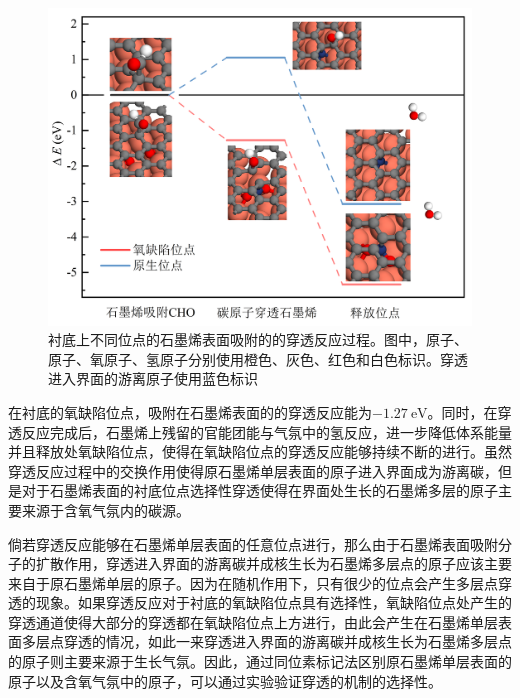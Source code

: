 \begin{figure}[htb]
    \includegraphics{pic/FLG_DFT_CHOpene.png}
    \caption{衬底上不同位点的石墨烯表面吸附的的穿透反应过程。图中，原子、原子、氧原子、氢原子分别使用橙色、灰色、红色和白色标识。穿透进入界面的游离原子使用蓝色标识}
    \label{fig:FLG_DFT_CHOpene}
\end{figure}

在衬底的氧缺陷位点，吸附在石墨烯表面的的穿透反应能为$\SI{-1.27}{\electronvolt}$。同时，在穿透反应完成后，石墨烯上残留的官能团能与气氛中的氢反应，进一步降低体系能量并且释放处氧缺陷位点，使得在氧缺陷位点的穿透反应能够持续不断的进行。虽然穿透反应过程中的交换作用使得原石墨烯单层表面的原子进入界面成为游离碳，但是对于石墨烯表面的衬底位点选择性穿透使得在界面处生长的石墨烯多层的原子主要来源于含氧气氛内的碳源。


倘若穿透反应能够在石墨烯单层表面的任意位点进行，那么由于石墨烯表面吸附分子的扩散作用，穿透进入界面的游离碳并成核生长为石墨烯多层点的原子应该主要来自于原石墨烯单层的原子。因为在随机作用下，只有很少的位点会产生多层点穿透的现象。如果穿透反应对于衬底的氧缺陷位点具有选择性，氧缺陷位点处产生的穿透通道使得大部分的穿透都在氧缺陷位点上方进行，由此会产生在石墨烯单层表面多层点穿透的情况，如此一来穿透进入界面的游离碳并成核生长为石墨烯多层点的原子则主要来源于生长气氛。因此，通过同位素标记法区别原石墨烯单层表面的原子以及含氧气氛中的原子，可以通过实验验证穿透的机制的选择性。


